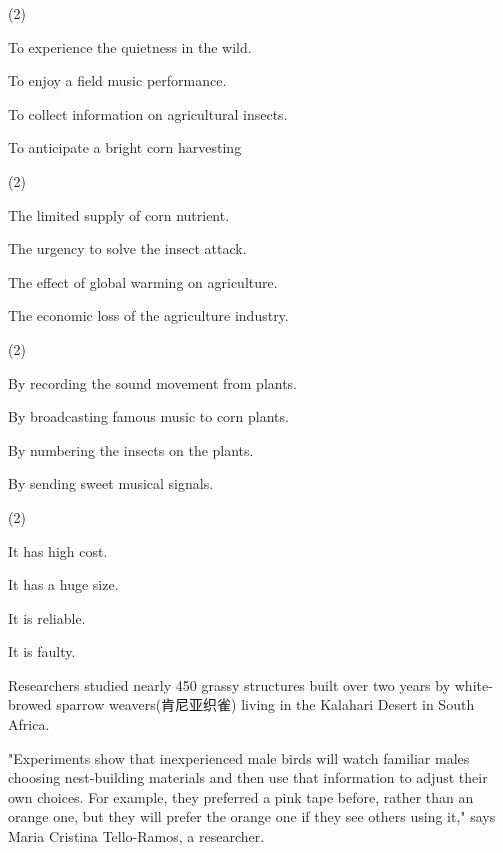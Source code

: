 \documentclass{英语试卷}
\begin{document}
\begin{choices}(2)
  \item To experience the quietness in the wild.
  \item To enjoy a field music performance.
  \item To collect information on agricultural insects.
  \item To anticipate a bright corn harvesting
\end{choices}
\begin{choices}(2)
  \item The limited supply of corn nutrient.
  \item The urgency to solve the insect attack.
  \item The effect of global warming on agriculture.
  \item The economic loss of the agriculture industry.
\end{choices}
\begin{choices}(2)
  \item By recording the sound movement from plants.
  \item By broadcasting famous music to corn plants.
  \item By numbering the insects on the plants.
  \item By sending sweet musical signals.
\end{choices}
\begin{choices}(2)
  \item It has high cost.
  \item It has a huge size.
  \item It is reliable.
  \item It is faulty.
\end{choices}
\par Researchers studied nearly 450 grassy structures built over two years by white-browed sparrow weavers(肯尼亚织雀) living in the Kalahari Desert in South Africa.\par
\par "Experiments show that inexperienced male birds will watch familiar males choosing nest-building materials and then use that information to adjust their own choices. For example, they preferred a pink tape before, rather than an orange one, but they will prefer the orange one if they see others using it," says Maria Cristina Tello-Ramos, a researcher.\par
\end{document}
